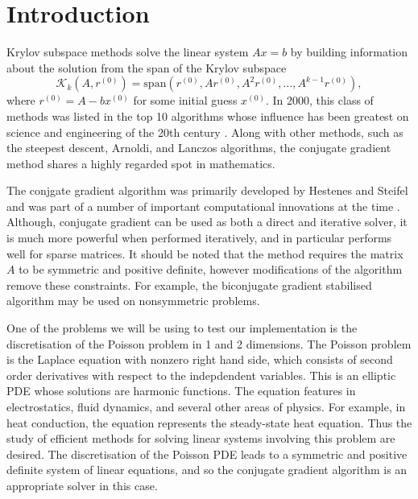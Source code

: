 
\section{Introduction}

\iffalse
Interesting, cogent account of the work in this report
> in the context of the mathematical problem considered 
> in the scientific computing more widely
Very well referenced.
\fi

Krylov subspace methods solve the linear system $Ax=b$ by building information about the solution from the span of the Krylov subspace 
\[
    \mathcal{K}_k(A, r^{(0)}) = \mathrm{span}\left( r^{(0)}, Ar^{(0)}, A^2r^{(0)}, \ldots, A^{k-1}r^{(0)} \right),
\]
where $r^{(0)} = A - bx^{(0)}$ for some initial guess $x^{(0)}$.
In 2000, this class of methods was listed in the top 10 algorithms whose influence has been greatest on science and engineering of the 20th century \cite{top10}. 
Along with other methods, such as the steepest descent, Arnoldi, and Lanczos algorithms, the conjugate gradient method shares a highly regarded spot in mathematics.

The conjgate gradient algorithm was primarily developed by Hestenes and Steifel and was part of a number of important computational innovations at the time \cite{cghist}.
Although, conjugate gradient can be used as both a direct and iterative solver, it is much more powerful when performed iteratively, and in particular performs well for sparse matrices.
It should be noted that the method requires the matrix $A$ to be symmetric and positive definite, however modifications of the algorithm remove these constraints.
For example, the biconjugate gradient stabilised algorithm may be used on nonsymmetric problems. 

One of the problems we will be using to test our implementation is the discretisation of the Poisson problem in 1 and 2 dimensions.
The Poisson problem is the Laplace equation with nonzero right hand side, which consists of second order derivatives with respect to the indepdendent variables.
This is an elliptic PDE whose solutions are harmonic functions. 
The equation features in electrostatics, fluid dynamics, and several other areas of physics.
For example, in heat conduction, the equation represents the steady-state heat equation.
Thus the study of efficient methods for solving linear systems involving this problem are desired.
The discretisation of the Poisson PDE leads to a symmetric and positive definite system of linear equations, and so the conjugate gradient algorithm is an appropriate solver in this case.

